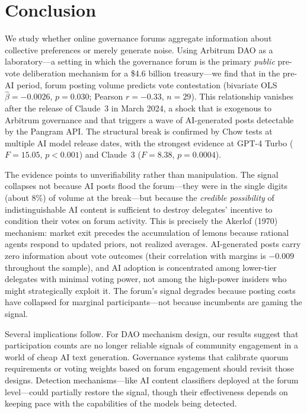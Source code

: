 \documentclass[12pt]{article}
\begin{document}


\section{Conclusion}
\label{sec:conclusion}


We study whether online governance forums aggregate information about collective
preferences or merely generate noise. Using Arbitrum DAO as a laboratory---a setting
in which the governance forum is the primary \emph{public} pre-vote deliberation
mechanism for a \$4.6 billion treasury---we find that in the pre-AI period,
forum posting volume predicts vote contestation (bivariate OLS $\hat{\beta} = -0.0026$,
$p = 0.030$; Pearson $r = -0.33$, $n = 29$). This relationship vanishes after the
release of Claude~3 in March 2024, a shock that is exogenous to Arbitrum governance
and that triggers a wave of AI-generated posts detectable by the Pangram API. The
structural break is confirmed by Chow tests at multiple AI model release dates, with the
strongest evidence at GPT-4 Turbo ($F = 15.05$, $p < 0.001$) and Claude~3
($F = 8.38$, $p = 0.0004$).

The evidence points to unverifiability rather than manipulation. The signal collapses not because
AI posts flood the forum---they were in the single digits (about 8\%) of volume at the break---but
because the \emph{credible possibility} of indistinguishable AI content is sufficient
to destroy delegates' incentive to condition their votes on forum activity. This is
precisely the Akerlof (1970) mechanism: market exit precedes the accumulation of
lemons because rational agents respond to updated priors, not realized averages.
AI-generated posts carry zero information about vote outcomes (their correlation with
margins is $-0.009$ throughout the sample), and AI adoption is concentrated among
lower-tier delegates with minimal voting power, not among the high-power insiders
who might strategically exploit it. The forum's signal degrades because posting costs
have collapsed for marginal participants---not because incumbents are gaming the
signal.

Several implications follow. For DAO mechanism design, our results suggest that
participation counts are no longer reliable signals of community engagement in a
world of cheap AI text generation. Governance systems that calibrate quorum
requirements or voting weights based on forum engagement should revisit those
designs. Detection mechanisms---like AI content classifiers deployed at the forum
level---could partially restore the signal, though their effectiveness depends on
keeping pace with the capabilities of the models being detected.
\end{document}
